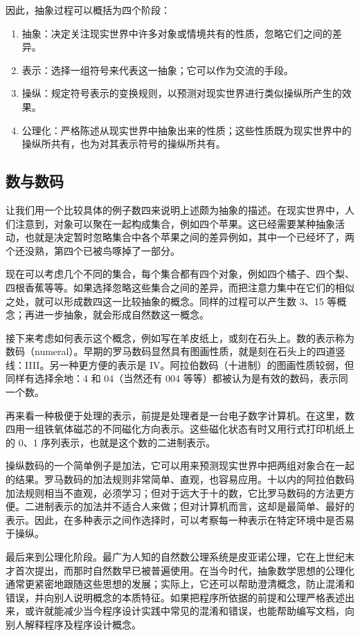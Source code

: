 \documentclass[twoside,11pt,fontset=none]{ctexbook}
\begin{document}
因此，抽象过程可以概括为四个阶段：

\begin{enumerate}[wide, nosep, label=(\arabic*)]
	\item 抽象：决定关注现实世界中许多对象或情境共有的性质，忽略它们之间的差异。
	\item 表示：选择一组符号来代表这一抽象；它可以作为交流的手段。
	\item 操纵：规定符号表示的变换规则，以预测对现实世界进行类似操纵所产生的效果。
	\item 公理化：严格陈述从现实世界中抽象出来的性质；这些性质既为现实世界中的操纵所共有，也为对其表示符号的操纵所共有。
\end{enumerate}

\subsection{数与数码}
让我们用一个比较具体的例子\textemdash{}数四\textemdash{}来说明上述颇为抽象的描述。在现实世界中，人们注意到，对象可以聚在一起构成集合，例如四个苹果。这已经需要某种抽象活动，也就是决定暂时忽略集合中各个苹果之间的差异\textemdash{}例如，其中一个已经坏了，两个还没熟，第四个已被鸟啄掉了一部分。

现在可以考虑几个不同的集合，每个集合都有四个对象，例如四个橘子、四个梨、四根香蕉等等。如果选择忽略这些集合之间的差异，而把注意力集中在它们的相似之处，就可以形成数四这一比较抽象的概念。同样的过程可以产生数 3、15 等概念；再进一步抽象，就会形成自然数这一概念。

接下来考虑如何表示这个概念，例如写在羊皮纸上，或刻在石头上。数的表示称为数码（numeral）。早期的罗马数码显然具有图画性质，就是刻在石头上的四道竖线：IIII。另一种更方便的表示是 IV。阿拉伯数码（十进制）的图画性质较弱，但同样有选择余地：4 和 04（当然还有 004 等等）都被认为是有效的数码，表示同一个数。

再来看一种极便于处理的表示，前提是处理者是一台电子数字计算机。在这里，数四用一组铁氧体磁芯的不同磁化方向表示。这些磁化状态有时又用行式打印机纸上的 0、1 序列表示，也就是这个数的二进制表示。

操纵数码的一个简单例子是加法，它可以用来预测现实世界中把两组对象合在一起的结果。罗马数码的加法规则非常简单、直观，也容易应用。十以内的阿拉伯数码加法规则相当不直观，必须学习；但对于远大于十的数，它比罗马数码的方法更方便。二进制表示的加法并不适合人来做；但对计算机而言，这却是最简单、最好的表示。因此，在多种表示之间作选择时，可以考察每一种表示在特定环境中是否易于操纵。

最后来到公理化阶段。最广为人知的自然数公理系统是皮亚诺公理，它在上世纪末才首次提出，而那时自然数早已被普遍使用。在当今时代，抽象数学思想的公理化通常更紧密地跟随这些思想的发展；实际上，它还可以帮助澄清概念，防止混淆和错误，并向别人说明概念的本质特征。如果把程序所依据的前提和公理严格表述出来，或许就能减少当今程序设计实践中常见的混淆和错误，也能帮助编写文档，向别人解释程序及程序设计概念。
\end{document}
